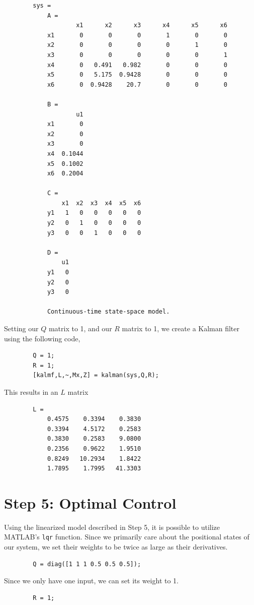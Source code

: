 \documentclass{article}
\theoremstyle{definition}
\begin{document}
    \begin{verbatim}
        sys =
            A = 
                    x1      x2      x3      x4      x5      x6
            x1       0       0       0       1       0       0
            x2       0       0       0       0       1       0
            x3       0       0       0       0       0       1
            x4       0   0.491   0.982       0       0       0
            x5       0   5.175  0.9428       0       0       0
            x6       0  0.9428    20.7       0       0       0
            
            B = 
                    u1
            x1       0
            x2       0
            x3       0
            x4  0.1044
            x5  0.1002
            x6  0.2004
            
            C = 
                x1  x2  x3  x4  x5  x6
            y1   1   0   0   0   0   0
            y2   0   1   0   0   0   0
            y3   0   0   1   0   0   0
            
            D = 
                u1
            y1   0
            y2   0
            y3   0
            
            Continuous-time state-space model.
    \end{verbatim}
    Setting our $Q$ matrix to 1, and our $R$ matrix to 1,
    we create a Kalman filter using the following code,
    \begin{verbatim}
        Q = 1;
        R = 1;
        [kalmf,L,~,Mx,Z] = kalman(sys,Q,R);
    \end{verbatim}
    This results in an $L$ matrix 
    \begin{verbatim}
        L =
            0.4575    0.3394    0.3830
            0.3394    4.5172    0.2583
            0.3830    0.2583    9.0800
            0.2356    0.9622    1.9510
            0.8249   10.2934    1.8422
            1.7895    1.7995   41.3303
    \end{verbatim}

    \section*{Step 5: Optimal Control}
    Using the linearized model described in Step 5, it is possible
    to utilize MATLAB's \texttt{lqr} function.
    Since we primarily care about the positional states of our system,
    we set their weights to be twice as large as their derivatives.
    \begin{verbatim}
        Q = diag([1 1 1 0.5 0.5 0.5]);
    \end{verbatim}
    Since we only have one input, we can set its weight to 1.
    \begin{verbatim}
        R = 1;
    \end{verbatim}
\end{document}
